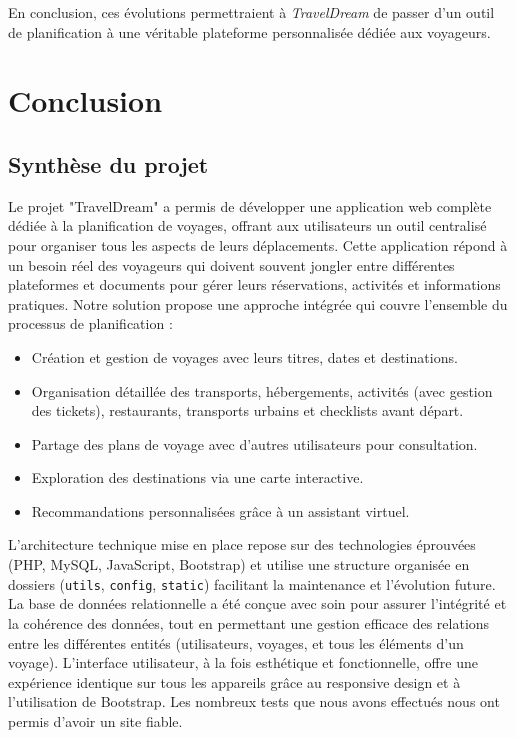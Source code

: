 \documentclass[a4paper,12pt]{article}
\begin{document}
En conclusion, ces évolutions permettraient à \textit{TravelDream} de passer d’un outil de planification à une véritable plateforme personnalisée dédiée aux voyageurs.
\section{Conclusion}

\subsection{Synthèse du projet}
Le projet "TravelDream" a permis de développer une application web complète dédiée à la planification de voyages, offrant aux utilisateurs un outil centralisé pour organiser tous les aspects de leurs déplacements. Cette application répond à un besoin réel des voyageurs qui doivent souvent jongler entre différentes plateformes et documents pour gérer leurs réservations, activités et informations pratiques.
Notre solution propose une approche intégrée qui couvre l'ensemble du processus de planification :
\begin{itemize}
    \item Création et gestion de voyages avec leurs titres, dates et destinations.
    \item Organisation détaillée des transports, hébergements, activités (avec gestion des tickets), restaurants, transports urbains et checklists avant départ.
    \item Partage des plans de voyage avec d'autres utilisateurs pour consultation.
    \item Exploration des destinations via une carte interactive.
    \item Recommandations personnalisées grâce à un assistant virtuel.
\end{itemize}
L'architecture technique mise en place repose sur des technologies éprouvées (PHP, MySQL, JavaScript, Bootstrap) et utilise une structure organisée en dossiers (\texttt{utils}, \texttt{config}, \texttt{static}) facilitant la maintenance et l'évolution future. La base de données relationnelle a été conçue avec soin pour assurer l'intégrité et la cohérence des données, tout en permettant une gestion efficace des relations entre les différentes entités (utilisateurs, voyages, et tous les éléments d'un voyage).
L'interface utilisateur, à la fois esthétique et fonctionnelle, offre une expérience identique sur tous les appareils grâce au responsive design et à l'utilisation de Bootstrap. Les nombreux tests que nous avons effectués nous ont permis d'avoir un site fiable.
\end{document}
